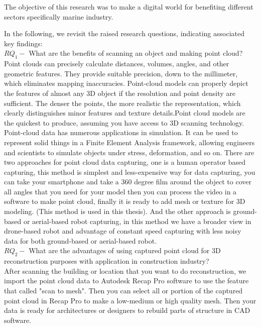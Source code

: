 

The objective of this research was to make a digital world for benefiting different sectors specifically marine industry. 

\noindent In the following, we revisit the raised research questions, indicating associated key findings:\\

\noindent $RQ_1-$ What are the benefits of scanning an object and making point cloud?  \\

\noindent Point clouds can precisely calculate distances, volumes, angles, and other geometric features. They provide suitable precision, down to the millimeter, which eliminates mapping inaccuracies. Point-cloud models can properly depict the features of almost any 3D object if the resolution and point density are sufficient. The denser the points, the more realistic the representation, which clearly distinguishes minor features and texture details.Point cloud models are the quickest to produce, assuming you have access to 3D scanning technology. Point-cloud data has numerous applications in simulation. It can be used to represent solid things in a Finite Element Analysis framework, allowing engineers and scientists to simulate objects under stress, deformation, and so on. There are two approaches for point cloud data capturing, one is a human operator based capturing, this method is simplest and less-expensive way for data capturing, you can take your smartphone and take a 360 degree film around the object to cover all angles that you need for your model then you can process the video in a software to make point cloud, finally it is ready to add mesh or texture for 3D modeling. (This method is used in this thesis). And the other approach is ground-based or aerial-based robot capturing, in this method we have a broader view in drone-based robot and advantage of constant speed capturing with less noisy data for both ground-based or aerial-based robot. \\


\noindent $RQ_2-$ What are the advantages of using captured point cloud for 3D reconstruction purposes with application in construction industry? \\
After scanning the building or location that you want to do reconstruction, we import the point cloud data to Autodesk Recap Pro software to use the feature that called "scan to mesh". Then you can select all or portion of the captured point cloud in Recap Pro to make a low-medium or high quality mesh. Then your data is ready for architectures or designers to rebuild parts of structure in CAD software. \\

